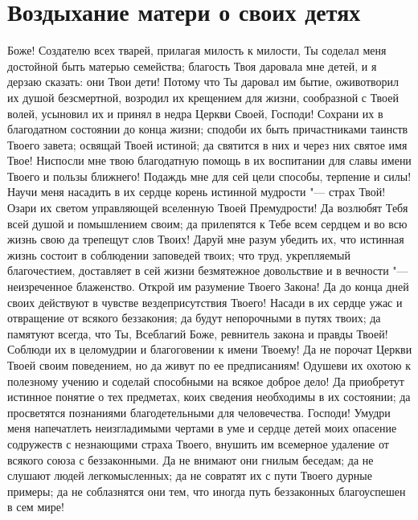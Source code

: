 \section{Воздыхание матери о своих детях}\begin{mymulticols}



Боже! Создателю всех тварей, прилагая милость к милости, Ты соделал меня достойной быть матерью семейства; благость Твоя даровала мне детей, и я дерзаю сказать: они Твои дети! Потому что Ты даровал им бытие, оживотворил их душой безсмертной, возродил их крещением для жизни, сообразной с Твоей волей, усыновил их и принял в недра Церкви Своей, Господи! Сохрани их в благодатном состоянии до конца жизни; сподоби их быть причастниками таинств Твоего завета; освящай Твоей истиной; да святится в них и через них святое имя Твое! Ниспосли мне твою благодатную помощь в их воспитании для славы имени Твоего и пользы ближнего! Подаждь мне для сей цели способы, терпение и силы! Научи меня насадить в их сердце корень истинной мудрости "--- страх Твой! Озари их светом управляющей вселенную Твоей Премудрости! Да возлюбят Тебя всей душой и помышлением своим; да прилепятся к Тебе всем сердцем и во всю жизнь свою да трепещут слов Твоих! Даруй мне разум убедить их, что истинная жизнь состоит в соблюдении заповедей твоих; что труд, укрепляемый благочестием, доставляет в сей жизни безмятежное довольствие и в вечности "--- неизреченное блаженство. Открой им разумение Твоего Закона! Да до конца дней своих действуют в чувстве вездеприсутствия Твоего! Насади в их сердце ужас и отвращение от всякого беззакония; да будут непорочными в путях твоих; да памятуют всегда, что Ты, Всеблагий Боже, ревнитель закона и правды Твоей! Соблюди их в целомудрии и благоговении к имени Твоему! Да не порочат Церкви Твоей своим поведением, но да живут по ее предписаниям! Одушеви их охотою к полезному учению и соделай способными на всякое доброе дело! Да приобретут истинное понятие о тех предметах, коих сведения необходимы в их состоянии; да просветятся познаниями благодетельными для человечества. Господи! Умудри меня напечатлеть неизгладимыми чертами в уме и сердце детей моих опасение содружеств с незнающими страха Твоего, внушить им всемерное удаление от всякого союза с беззаконными. Да не внимают они гнилым беседам; да не слушают людей легкомысленных; да не совратят их с пути Твоего дурные примеры; да не соблазнятся они тем, что иногда путь беззаконных благоуспешен в сем мире!


\end{mymulticols}
